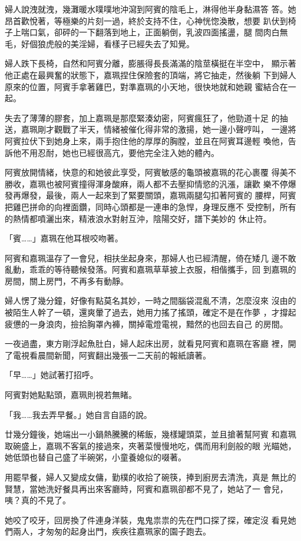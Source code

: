 婦人說洩就洩，幾灘暖水噗噗地沖瀉到阿賓的陰毛上，淋得他半身黏濕答
答。她昂首歡悅著，等極樂的片刻一過，終於支持不住，心神恍惚渙散，想要
趴伏到椅子上喘口氣，卻砰的一下翻落到地上，正面躺倒，乳波四面搖盪，腿
間肉白無毛，好個狼虎般的美淫婦，看樣子已經失去了知覺。

婦人跌下長椅，自然和阿賓分離，膨脹得長長滿滿的陰莖橫挺在半空中，
顯示著他正處在最興奮的狀態下，嘉珮捏住保險套的頂端，將它抽走，然後躺
下到婦人原來的位置，阿賓手拿著雞巴，對準嘉珮的小天地，很快地就和她親
蜜結合在一起。

失去了薄薄的膠套，加上嘉珮是那麼緊湊幼密，阿賓瘋狂了，他勁道十足
的抽送，嘉珮剛才觀戰了半天，情緒被催化得非常的激揚，她一邊小聲哼叫，
一邊將阿賓拉伏下到她身上來，兩手抱住他的厚厚的胸膛，並且在阿賓耳邊輕
喚他，告訴他不用忍耐，她也已經很高亢，要他完全注入她的體內。

阿賓放開情緒，快意的和她彼此享受，阿賓敏感的龜頭被嘉珮的花心裹覆
得美不勝收，嘉珮也被阿賓撞得渾身酸麻，兩人都不去壓抑情慾的汎漲，讓歡
樂不停爆發再爆發，最後，兩人一起來到了緊要關頭，嘉珮兩腿勾扣著阿賓的
腰桿，阿賓把雞巴拼命的向裡面鑽，同時心頭都是一連串的急悍，身理反應不
受控制，所有的熱情都噴灑出來，精液浪水對射互沖，陰陽交好，譜下美妙的
休止符。

「賓……」嘉珮在他耳根咬吻著。

阿賓和嘉珮溫存了一會兒，相扶坐起身來，那婦人也已經清醒，倚在矮几
邊不敢亂動，乖乖的等待聽候發落。阿賓和嘉珮草草披上衣服，相偕攜手，回
到嘉珮的房間，關上房門，不再多有動靜。

婦人愣了幾分鐘，好像有點莫名其妙，一時之間腦袋混亂不清，怎麼沒來
沒由的被陌生人幹了一頓，還爽暈了過去，她用力搖了搖頭，確定不是在作夢
，才撐起疲憊的一身浪肉，撿拾胸罩內褲，關掉電燈電視，黯然的也回去自己
的房間。

一夜過盡，東方剛浮起魚肚白，婦人起床出房，就看見阿賓和嘉珮在客廳
裡，開了電視看晨間新聞，阿賓翻出幾張一二天前的報紙讀著。

「早……」她試著打招呼。

阿賓對她點點頭，嘉珮則視若無睹。

「我……我去弄早餐。」她自言自語的說。

廿幾分鐘後，她端出一小鍋熱騰騰的稀飯，幾樣罐頭菜，並且搶著幫阿賓
和嘉珮取碗盛上，嘉珮不客氣的接過來，夾著菜慢慢地吃，偶而用利劍般的眼
光瞄她，她低頭也替自己盛了半碗粥，小童養媳似的啜著。

用罷早餐，婦人又變成女傭，勤樸的收拾了碗筷，捧到廚房去清洗，真是
無比的賢慧，當她洗好餐具再出來客廳時，阿賓和嘉珮卻都不見了，她站了一
會兒，咦？真的不見了。

她咬了咬牙，回房換了件連身洋裝，鬼鬼祟祟的先在門口探了探，確定沒
看見她們兩人，才匆匆的起身出門，疾疾往嘉珮家的園子跑去。

